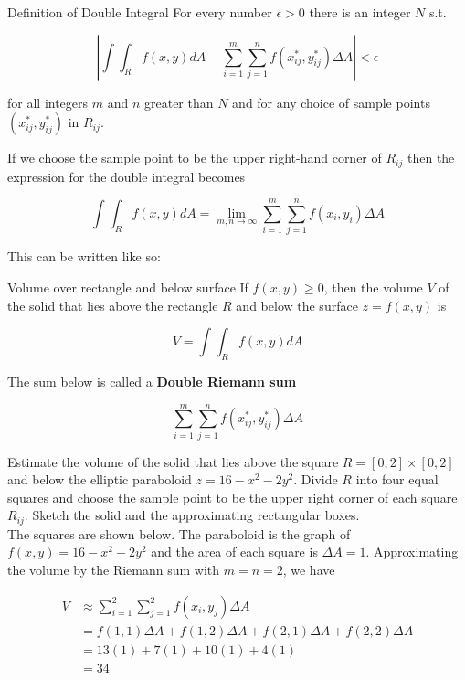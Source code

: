         \begin{theorem}{Definition of Double Integral}
            For every number $\epsilon > 0$ there is an integer $N$ s.t.

            \[
                \left| \int \int_R f(x,y) dA - \sum^m_{i=1} \sum^n_{j=1} f\left(x^*_{ij}, y^*_{ij}\right) \Delta A \right| < \epsilon
            \]

            for all integers $m$ and $n$ greater than $N$ and for any choice of sample points $\left(x^*_{ij}, y^*_{ij}\right)$ in $R_{ij}$.
        \end{theorem}

        If we choose the sample point to be the upper right-hand corner of $R_{ij}$ then the expression for the double integral becomes

        \[
            \int \int_R f(x,y) dA = \lim_{m, n\to\infty} \sum^m_{i=1} \sum^n_{j = 1} f\left(x_i, y_i \right) \Delta A
        \]

        This can be written like so:

        \begin{theorem}{Volume over rectangle and below surface}
            If $f(x,y) \geq 0$, then the volume $V$ of the solid that lies above the rectangle $R$ and below the surface $z=f(x,y)$ is

            \[
                V = \int \int_R f(x,y) dA
            \]
        \end{theorem}

        The sum below is called a \textbf{Double Riemann sum}

        \[
            \sum^m_{i=1} \sum^n_{j=1} f\left(x^*_{ij}, y^*_{ij}\right) \Delta A
        \]

        \textit{} Estimate the volume of the solid that lies above the square $R = [0, 2] \times [0, 2]$ and below the elliptic paraboloid $z=16 - x^2 - 2y^2$. Divide $R$ into four equal squares and choose
        the sample point to be the upper right corner of each square $R_{ij}$. Sketch the solid and the approximating rectangular boxes. \\

        The squares are shown below. The paraboloid is the graph of $f(x,y) = 16 - x^2 - 2y^2$ and the area of each square is $\Delta A = 1$. Approximating the volume by the Riemann sum with $m=n=2$, we have

        \begin{align*}
            V   &\approx \sum^2_{i=1} \sum^2_{j=1} f(x_i, y_j) \Delta A \\
                &= f(1,1)\Delta A + f(1,2) \Delta A + f(2,1) \Delta A + f(2,2) \Delta A \\
                &= 13(1) + 7(1) + 10(1) + 4(1) \\
                &= 34
        \end{align*}

